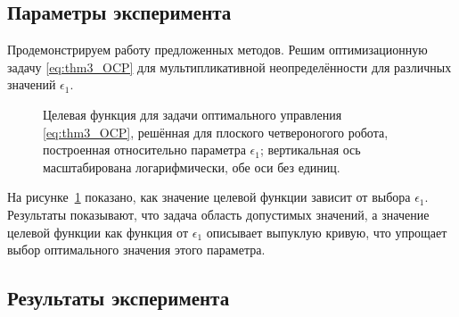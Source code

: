\subsection{Параметры эксперимента}\label{sec:ch3/sect3/sub2}
Продемонстрируем работу предложенных методов. Решим оптимизационную задачу \eqref{eq:thm3_OCP} для мультипликативной неопределённости для различных значений $\epsilon_1$. 
\begin{figure}[ht]
	\caption{Целевая функция для задачи оптимального управления \eqref{eq:thm3_OCP}, решённая для плоского четвероногого робота, построенная относительно параметра $\epsilon_1$; вертикальная ось масштабирована логарифмически, обе оси без единиц.}\label{fig:mult_unit_cost}
\end{figure} 

На рисунке~\ref{fig:mult_unit_cost} показано, как значение целевой функции зависит от выбора $\epsilon_1$. Результаты показывают, что задача область допустимых значений, а значение целевой функции как функция от $\epsilon_1$ описывает выпуклую кривую, что упрощает выбор оптимального значения этого параметра.

\subsection{Результаты эксперимента}\label{sec:ch3/sect3/sub3}
